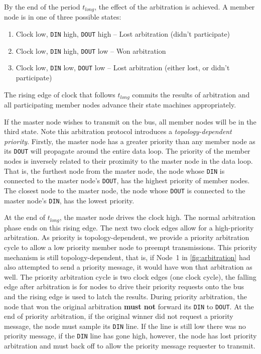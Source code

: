 By the end of the period $t_{long}$, the effect of the arbitration is
achieved. A member node is in one of three possible states:
\begin{enumerate}
  \item Clock low, {\tt DIN} high, {\tt DOUT} high -- Lost arbitration
    (didn't participate)
  \item Clock low, {\tt DIN} high, {\tt DOUT} low -- Won arbitration
  \item Clock low, {\tt DIN} low, {\tt DOUT} low -- Lost arbitration
    (either lost, or didn't participate)
\end{enumerate}
The rising edge of clock that follows $t_{long}$ commits the results of
arbitration and all participating member nodes advance their state machines
appropriately.

If the master node wishes to transmit on the bus, all member nodes will be in
the third state. Note this arbitration protocol introduces a {\em
topology-dependent priority}. Firstly, the master node has a greater priority
than any member node as its {\tt DOUT} will propagate around the entire data
loop. The priority of the member nodes is inversely related to their proximity
to the master node in the data loop. That is, the furthest node from the
master node, the node whose {\tt DIN} is connected to the master node's
{\tt DOUT}, has the highest priority of member nodes. The closest node to the
master node, the node whose {\tt DOUT} is connected to the master node's
{\tt DIN}, has the lowest priority.

At the end of $t_{long}$, the master node drives the clock high. The
normal arbitration phase ends on this rising edge. The next two clock edges
allow for a high-priority arbitration. As \bus priority is topology-dependent,
we provide a priority arbitration cycle to allow a low priority member node to
preempt transmissions. This priority mechanism is still topology-dependent,
that is, if Node~1 in \cref{fig:arbitration} had also attempted to send
a priority message, it would have won that arbitration as well. The priority
arbitration cycle is two clock edges (one clock cycle), the falling edge after
arbitration is for nodes to drive their priority requests onto the bus and the
rising edge is used to latch the results.  During priority arbitration, the
node that won the original arbitration {\bf must not} forward its {\tt DIN} to
{\tt DOUT}. At the end of priority
arbitration, if the original winner did not request a priority message, the
node must sample its {\tt DIN} line. If the line is still low there was no
priority message, if the {\tt DIN} line has gone high, however, the node
has lost priority arbitration and must back off to allow the priority message
requester to transmit.

